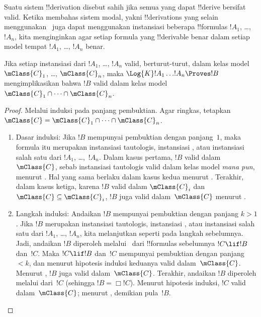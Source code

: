 \documentclass[../../../include/open-logic-section]{subfiles}
\begin{document}


Suatu sistem !!{derivation} disebut sahih jika semua yang dapat !!{derive}
bersifat valid. Ketika membahas sistem modal, yakni !!{derivation}s yang
selain menggunakan~ juga dapat menggunakan instansiasi beberapa
!!{formula}s $!A_1$, \dots,~$!A_n$, kita menginginkan agar setiap formula
yang !!{derivable} benar dalam setiap model tempat $!A_1$, \dots, $!A_n$
benar.

\begin{thm}
  Jika setiap instansiasi dari $!A_1$, \dots, $!A_n$ valid, berturut-turut,
  dalam kelas model $\mClass{C}_1$, \dots, $\mClass{C}_n$, maka
  $\Log{K}!A_1\dots !A_n\Proves !B$ mengimplikasikan bahwa $!B$ valid dalam
  kelas model $\mClass{C}_1\cap\dots\cap\mClass{C}_n$.
\end{thm}

\begin{proof}
  Melalui induksi pada panjang pembuktian. Agar ringkas, tetapkan
  $\mClass{C}=\mClass{C}_1\cap\dots\cap\mClass{C}_n$.
  \begin{enumerate}
  \item Dasar induksi: Jika $!B$ mempunyai pembuktian dengan panjang~$1$,
    maka formula itu merupakan instansiasi tautologis, instansiasi
    , atau instansiasi salah satu
    dari $!A_1$, \dots,~$!A_n$. Dalam kasus pertama, $!B$ valid dalam
    $\mClass{C}$, sebab instansiasi tautologis valid dalam kelas model
    \emph{mana pun}, menurut . Hal yang sama
    berlaku dalam kasus kedua menurut
    . Terakhir, dalam kasus ketiga,
    karena $!B$ valid dalam $\mClass{C}_i$ dan
    $\mClass{C}\subseteq\mClass{C}_i$, $!B$ juga valid dalam~$\mClass{C}$
    menurut .
  \item Langkah induksi: Andaikan $!B$ mempunyai pembuktian dengan panjang
    $k>1$. Jika $!B$ merupakan instansiasi tautologis, instansiasi
    , atau instansiasi salah
    satu dari $!A_1$, \dots, $!A_n$, kita melanjutkan seperti pada langkah
    sebelumnya. Jadi, andaikan $!B$ diperoleh melalui~\MP{} dari !!{formula}s
    sebelumnya $!C\lif !B$ dan~$!C$. Maka $!C\lif !B$ dan~$!C$ mempunyai
    pembuktian dengan panjang~$<k$, dan menurut hipotesis induksi keduanya
    valid dalam~$\mClass{C}$. Menurut , $!B$
    juga valid dalam~$\mClass{C}$. Terakhir, andaikan $!B$ diperoleh melalui
    \Nec{} dari~$!C$ (sehingga $!B=\Box!C$). Menurut hipotesis induksi, $!C$
    valid dalam~$\mClass{C}$; menurut ,
    demikian pula~$!B$.
  \end{enumerate}
\end{proof}
\end{document}
